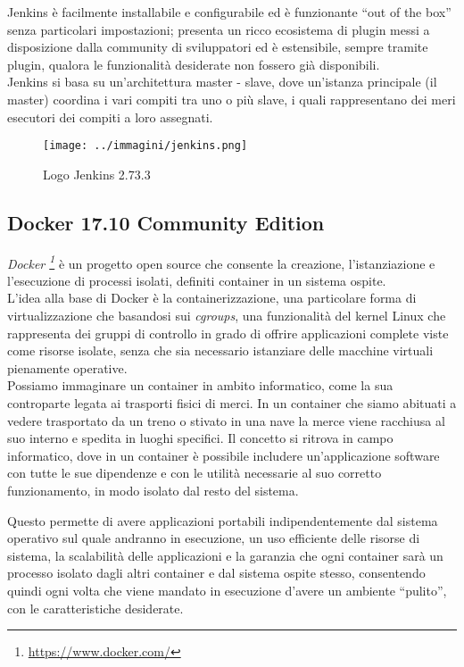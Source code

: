 Jenkins è facilmente installabile e configurabile ed è funzionante ``out of the box'' senza particolari impostazioni; presenta un ricco ecosistema di \gls{plugin} messi a disposizione dalla community di sviluppatori ed è estensibile, sempre tramite \gls{plugin}, qualora le funzionalità desiderate non fossero già disponibili.\\

Jenkins si basa su un'architettura \gls{master} - \gls{slave}, dove un'istanza principale (il \gls{master}) coordina i vari compiti tra uno o più \gls{slave}, i quali rappresentano dei meri esecutori dei compiti a loro assegnati.

\begin{figure}[H]
    \capstart
    \centering
    \texttt{[image: ../immagini/jenkins.png]}
    \caption{Logo Jenkins 2.73.3}
\end{figure}

\subsection{Docker 17.10 Community Edition}

\textit{Docker \footnote{\url{https://www.docker.com/}}} è un progetto open source che consente la creazione, l'istanziazione e l'esecuzione di processi isolati, definiti \gls{container} in un sistema ospite. \\

L'idea alla base di Docker è la containerizzazione, una particolare forma di virtualizzazione che basandosi sui \textit{cgroups}, una funzionalità del kernel \gls{Linux} che rappresenta dei gruppi di controllo in grado di offrire applicazioni complete viste come risorse isolate, senza che sia necessario istanziare delle macchine virtuali pienamente operative. \\

Possiamo immaginare un container in ambito informatico, come la sua controparte legata ai trasporti fisici di merci. In un container che siamo abituati a vedere trasportato da un treno o stivato in una nave la merce viene racchiusa al suo interno e spedita in luoghi specifici. Il concetto si ritrova in campo informatico, dove in un container è possibile includere un'applicazione software con tutte le sue dipendenze e con le utilità necessarie al suo corretto funzionamento, in modo isolato dal resto del sistema. 

Questo permette di avere applicazioni portabili indipendentemente dal sistema operativo sul quale andranno in esecuzione, un uso efficiente delle risorse di sistema, la scalabilità delle applicazioni e la garanzia che ogni \gls{container} sarà un processo isolato dagli altri \gls{container} e dal sistema ospite stesso, consentendo quindi ogni volta che viene mandato in esecuzione d'avere un ambiente ``pulito'', con le caratteristiche desiderate. 

